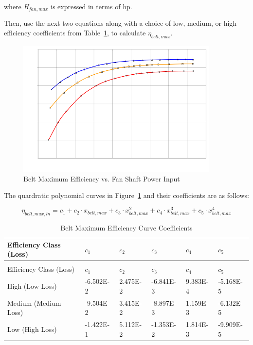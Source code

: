 where \emph{H\(_{fan,max}\)} is expressed in terms of hp.

Then, use the next two equations along with a choice of low, medium, or high efficiency coefficients from Table~\ref{table:belt-maximum-efficiency-curve-coefficients}, to calculate \(\eta_{belt,max}\).

\begin{figure}[hbtp] %
\centering
\includegraphics[width=0.9\textwidth, height=0.9\textheight, keepaspectratio=true]{media/image4907.svg.png}
\caption{Belt Maximum Efficiency vs. Fan Shaft Power Input \protect \label{fig:belt-maximum-efficiency-vs.-fan-shaft-power}}
\end{figure}

The quardratic polynomial curves in Figure~\ref{fig:belt-maximum-efficiency-vs.-fan-shaft-power} and their coefficients are as follows:

\begin{equation}
{\eta_{belt,max,ln}} = {c_1} + {c_2} \cdot {x_{belt,max}} + {c_3} \cdot x_{belt,max}^2 + {c_4} \cdot x_{belt,max}^3 + {c_5} \cdot x_{belt,max }^4
\end{equation}

\begin{longtable}[c]{p{1.0in}p{1.0in}p{1.0in}p{1.0in}p{1.0in}p{1.0in}}
\caption{Belt Maximum Efficiency Curve Coefficients \label{table:belt-maximum-efficiency-curve-coefficients}} \tabularnewline
\toprule 
Efficiency Class (Loss) & \(c_1\) & \(c_2\) & \(c_3\) & \(c_4\) & \(c_5\) \tabularnewline
\midrule
\endfirsthead

\caption[]{Belt Maximum Efficiency Curve Coefficients} \tabularnewline
\toprule 
Efficiency Class (Loss) & \(c_1\) & \(c_2\) & \(c_3\) & \(c_4\) & \(c_5\) \tabularnewline
\midrule
\endhead

High (Low Loss) & -6.502E-2 & 2.475E-2 & -6.841E-3 & 9.383E-4 & -5.168E-5 \tabularnewline
Medium (Medium Loss) & -9.504E-2 & 3.415E-2 & -8.897E-3 & 1.159E-3 & -6.132E-5 \tabularnewline
Low (High Loss) & -1.422E-1 & 5.112E-2 & -1.353E-2 & 1.814E-3 & -9.909E-5 \tabularnewline
\bottomrule
\end{longtable}

